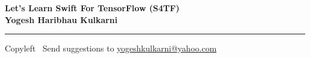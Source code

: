 
\graphicspath{{images/}}

\footnotesize


\begin{center}
\Large{\textbf{Let's Learn Swift For TensorFlow (S4TF)\\ Yogesh Haribhau Kulkarni}}  
\end{center}

\begin{multicols}{2}

\end{multicols}

\rule{\linewidth}{0.25pt}
\scriptsize
Copyleft \textcopyleft\  Send suggestions to 
\href{http://www.yogeshkulkarni.com}{yogeshkulkarni@yahoo.com}


